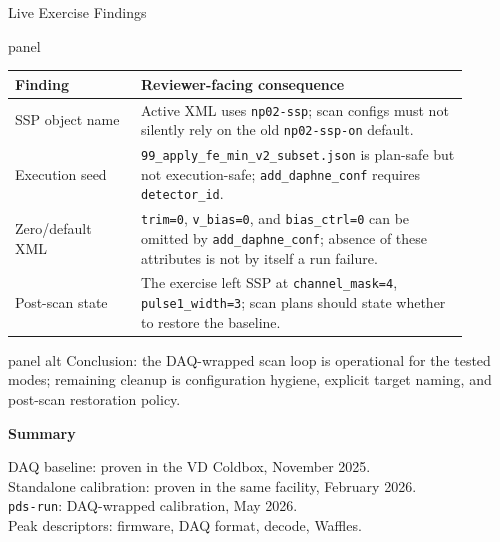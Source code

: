 \documentclass[aspectratio=169,10pt]{beamer}
\begin{document}
\begin{frame}[t]{Live Exercise Findings}
\begin{beamercolorbox}[wd=\linewidth,sep=4pt,rounded=true]{panel}
\scriptsize
\renewcommand{\arraystretch}{1.16}
\begin{tabular}{@{}>{\raggedright\arraybackslash}p{0.25\linewidth}>{\raggedright\arraybackslash}p{0.65\linewidth}@{}}
\toprule
\textbf{Finding} & \textbf{Reviewer-facing consequence} \\
\midrule
SSP object name & Active XML uses \texttt{np02-ssp}; scan configs must not silently rely on the old \texttt{np02-ssp-on} default. \\
Execution seed & \texttt{99\_apply\_fe\_min\_v2\_subset.json} is plan-safe but not execution-safe; \texttt{add\_daphne\_conf} requires \texttt{detector\_id}. \\
Zero/default XML & \texttt{trim=0}, \texttt{v\_bias=0}, and \texttt{bias\_ctrl=0} can be omitted by \texttt{add\_daphne\_conf}; absence of these attributes is not by itself a run failure. \\
Post-scan state & The exercise left SSP at \texttt{channel\_mask=4}, \texttt{pulse1\_width=3}; scan plans should state whether to restore the baseline. \\
\bottomrule
\end{tabular}
\end{beamercolorbox}

\vspace{1.5mm}
\begin{beamercolorbox}[wd=\linewidth,sep=4pt,rounded=true]{panel alt}
\scriptsize
Conclusion: the DAQ-wrapped scan loop is operational for the tested modes; remaining cleanup is configuration hygiene, explicit target naming, and post-scan restoration policy.
\end{beamercolorbox}
\end{frame}

\begin{frame}[plain]
\vspace*{0.22\paperheight}
{\color{white}\bfseries\fontsize{30}{34}\selectfont Summary\par}
\vspace{5mm}
{\color{noirmuted}\Large
DAQ baseline: proven in the VD Coldbox, November 2025.\\[2mm]
Standalone calibration: proven in the same facility, February 2026.\\[2mm]
\texttt{pds-run}: DAQ-wrapped calibration, May 2026.\\[2mm]
Peak descriptors: firmware, DAQ format, decode, Waffles.
\par}
\end{frame}
\end{document}
